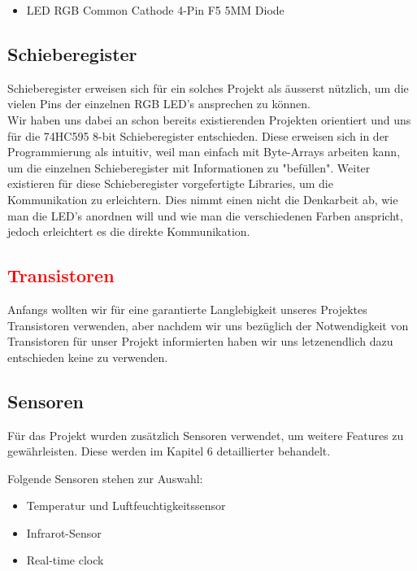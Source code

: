 \documentclass[12pt,a4paper]{article}
\begin{document}
\begin{itemize}
    \item LED RGB Common Cathode 4-Pin F5 5MM Diode
\end{itemize}

\subsection{Schieberegister}

Schieberegister erweisen sich für ein solches Projekt als äusserst nützlich, um die vielen Pins der einzelnen RGB LED's ansprechen zu können. \\

Wir haben uns dabei an schon bereits existierenden Projekten orientiert \cite{RGB LED Cube} und uns für die 74HC595 8-bit Schieberegister entschieden. Diese erweisen sich in der Programmierung als intuitiv, weil man einfach mit Byte-Arrays arbeiten kann, um die einzelnen Schieberegister mit Informationen zu "befüllen". Weiter existieren für diese Schieberegister vorgefertigte Libraries, um die Kommunikation zu erleichtern\cite{SPI}.
Dies nimmt einen nicht die Denkarbeit ab, wie man die LED's anordnen will und wie man die verschiedenen Farben anspricht, jedoch erleichtert es die direkte Kommunikation.

\subsection{\textcolor{red}{Transistoren}}

Anfangs wollten wir für eine garantierte Langlebigkeit unseres Projektes Transistoren verwenden, aber nachdem wir uns bezüglich der Notwendigkeit
von Transistoren für unser Projekt informierten haben wir uns letzenendlich dazu entschieden keine zu verwenden.

\subsection{Sensoren}

Für das Projekt wurden zusätzlich Sensoren verwendet, um weitere Features zu gewährleisten. Diese werden im Kapitel 6 detaillierter behandelt.

Folgende Sensoren stehen zur Auswahl:
\begin{itemize}
    \item Temperatur und Luftfeuchtigkeitssensor
    \item Infrarot-Sensor
    \item Real-time clock
\end{itemize}
\end{document}
